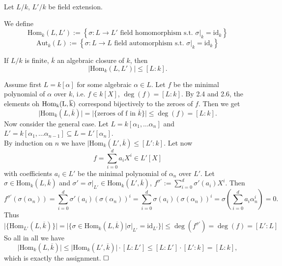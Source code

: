 \documentclass[11pt]{book}
\theoremstyle{nonumberbreak}
\newenvironment{pr}[1][]{\ifthenelse{\equal{#1}{}}{\proof}{\proof[#1]}\rm}{\endproof}
\newenvironment{definprop}[1][]{\ifthenelse{\equal{#1}{}}{\definiprop}{\definiprop[#1]}\rm}{\enddefiniprop}
\begin{document}
\begin{spacing}{1.3}
\begin{definprop} %
Let $L/k$, $L'/k$ be field extension.
\begin{compactenum}
\item We define $$\textrm{Hom}_{k}(L,L'):=\left\{\sigma: L\longrightarrow L' \textrm{ field homomorphism s.t. } \sigma |_{k}=\textrm{id}_{k}\right\}$$
$$\textrm{Aut}_{k}(L):=\left\{\sigma: L \longrightarrow L \textrm{ field automorphism s.t. } \sigma |_{k}=\textrm{id}_{k} \right\}$$
\item If $L/k$ is finite, $\overline{k}$ an algebraic closure of $k$, then 
$$ \vert \textrm{Hom}_{k}(L,L') \vert \leqslant [L:k].$$
\end{compactenum}
\begin{pr}
Assume first $L=k[\alpha]$ for some algebraic $\alpha \in L$.
Let $f$ be the minimal polynomial of $\alpha$ over $k$, i.e. $f \in k[X]$, $\deg(f)=[L:k]$.
By 2.4 and 2.6, the elements oh $\rm{Hom}_{k}(L, \overline{k})$ correspond bijectively to the zeroes of $f$. Then we get
$$ \vert \textrm{Hom}_{k}(L, \overline{k}) \vert = \vert \{\textrm{zeroes of f in }\overline{k} \}\vert \leqslant \deg(f) = [L:k].$$
Now consider the general case. Let $L=k[\alpha_1, \dots \alpha_n]$ and $L'=k[\alpha_1, \dots \alpha_{n-1}] \subseteq L= L'[\alpha_n]$.\\
By induction on $n$ we have $\vert \textrm{Hom}_{k}(L', \overline{k}) \leqslant [L':k]$.
Let now $$f=\sum_{i=0}^d a_i X^{i} \in L'[X]$$ with coefficients $a_i \in L'$ be the minimal polynomial of $\alpha_n$ over $L'$.  Let $\sigma \in \textrm{Hom}_{k}(L, \overline{k})$ and $\sigma'=\sigma |_{L'} \in \textrm{Hom}_{k}(L', \overline{k})$, $f^{\sigma'}:= \sum_{i=0}^d \sigma'(a_i) X^{i}$. Then
$$f^{\sigma'}\left(\sigma(\alpha_n)\right)=\sum_{i=0}^d \sigma'(a_i) \left(\sigma(\alpha_n)\right)^{i}=\sum_{i=0}^d \sigma(a_i) \left(\sigma(\alpha_n)\right)^{i} = \sigma \left(\sum_{i=0}^d a_i \alpha_n^{i}\right)=0.$$
Thus
$$ \vert \{\textrm{Hom}_{L'}(L, \overline{k}) \}\vert=\vert \{\sigma \in \textrm{Hom}_{k}(L, \overline{k}) \big \vert \sigma |_{L'}=\textrm{id}_{L'}\} \vert \leqslant \deg(f^{\sigma'}) = \deg (f) = [L':L]$$
So all in all we have
$$\vert \textrm{Hom}_{k}(L, \overline{k}) \vert \leqslant \vert \textrm{Hom}_{k}(L', \overline{k}) \vert \cdot [L:L'] \leqslant [L:L'] \cdot [L':k]=[L:k],$$
which is exactly the assignment. $\hfill \Box$
\end{pr}
\end{definprop}


\end{spacing}
\end{document}
